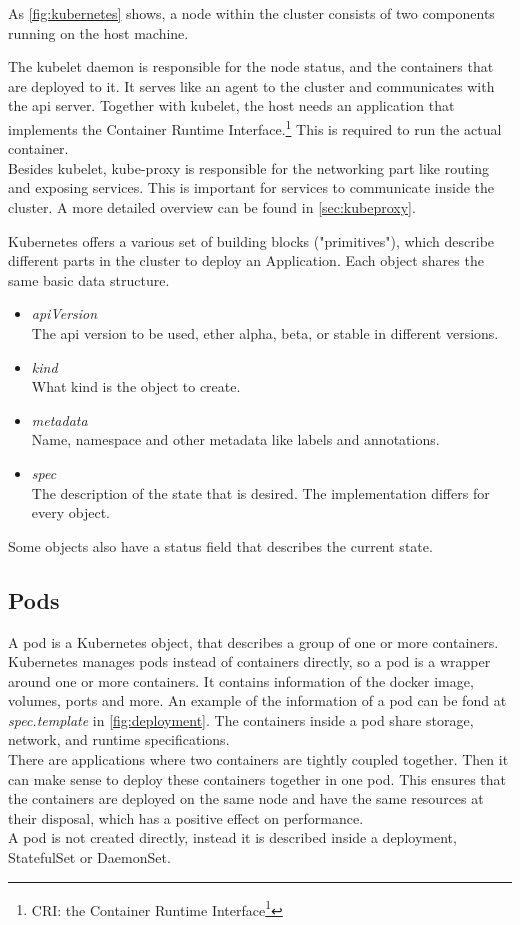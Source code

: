 As \autoref{fig:kubernetes} shows, a node within the cluster consists of two components running on the host machine.

The kubelet daemon is responsible for the node status, and the containers that are deployed to it.
It serves like an agent to the cluster and communicates with the api server.
Together with kubelet, the host needs an application that implements the Container Runtime Interface.\footnote{CRI: the Container Runtime Interface\footcite{CRI}}
This is required to run the actual container.
\\
Besides kubelet, kube-proxy is responsible for the networking part like routing and exposing services.
This is important for services to communicate inside the cluster.
A more detailed overview can be found in \autoref{sec:kubeproxy}.\cite{KUBERNETES-COMPONENTS}
\\
\newpage

Kubernetes offers a various set of building blocks ("primitives"), which describe different parts in the cluster to deploy an Application.
Each object shares the same basic data structure.

\begin{itemize}
    \item \textit{apiVersion} \\
    The api version to be used, ether alpha, beta, or stable in different versions.
    \item \textit{kind} \\
    What kind is the object to create.
    \item \textit{metadata} \\
    Name, namespace and other metadata like labels and annotations.
    \item \textit{spec} \\
    The description of the state that is desired.
    The implementation differs for every object.
\end{itemize}

Some objects also have a status field that describes the current state.~\cite{KUBERNETES-OBJECTS}

\subsection{Pods}
A pod is a Kubernetes object, that describes a group of one or more containers.
Kubernetes manages pods instead of containers directly, so a pod is a wrapper around one or more containers.
It contains information of the docker image, volumes, ports and more.
An example of the information of a pod can be fond at \textit{spec.template} in \autoref{fig:deployment}.
The containers inside a pod share storage, network, and runtime specifications.
\\
There are applications where two containers are tightly coupled together.
Then it can make sense to deploy these containers together in one pod.
This ensures that the containers are deployed on the same node and have the same resources at their disposal, which has a positive effect on performance.
\\
A pod is not created directly, instead it is described inside a deployment, StatefulSet or DaemonSet.~\cite{KUBERNETES-POD}

